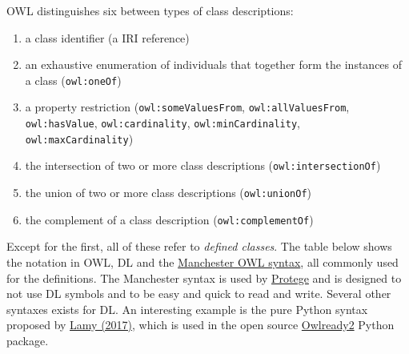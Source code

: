 \documentclass[a4paper,]{report}
\providecommand{\tightlist}{%
  \setlength{\itemsep}{0pt}\setlength{\parskip}{0pt}}
\begin{document}
OWL distinguishes six between types of class descriptions:

\begin{enumerate}
\def\labelenumi{\arabic{enumi}.}
\tightlist
\item
  a class identifier (a IRI reference)
\item
  an exhaustive enumeration of individuals that together form the
  instances of a class (\texttt{owl:oneOf})
\item
  a property restriction (\texttt{owl:someValuesFrom},
  \texttt{owl:allValuesFrom}, \texttt{owl:hasValue},
  \texttt{owl:cardinality}, \texttt{owl:minCardinality},
  \texttt{owl:maxCardinality})
\item
  the intersection of two or more class descriptions
  (\texttt{owl:intersectionOf})
\item
  the union of two or more class descriptions (\texttt{owl:unionOf})
\item
  the complement of a class description (\texttt{owl:complementOf})
\end{enumerate}

Except for the first, all of these refer to \emph{defined classes}. The
table below shows the notation in OWL, DL and the
\href{http://ceur-ws.org/Vol-216/submission_9.pdf}{Manchester OWL
syntax}, all commonly used for the definitions. The Manchester syntax is
used by \href{https://protege.stanford.edu/}{Protege} and is designed to
not use DL symbols and to be easy and quick to read and write. Several
other syntaxes exists for DL. An interesting example is the pure Python
syntax proposed by
\href{http://www.lesfleursdunormal.fr/_downloads/article_owlready_aim_2017.pdf}{Lamy
(2017)}, which is used in the open source
\href{https://pythonhosted.org/Owlready2/}{Owlready2} Python package.
\end{document}
